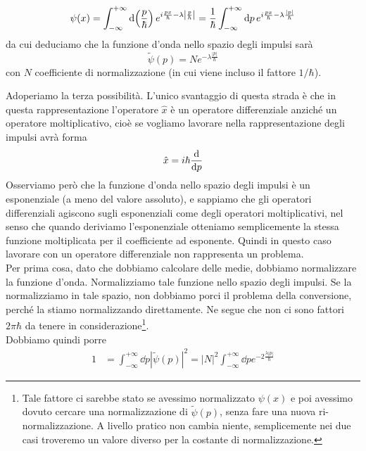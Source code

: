\begin{soluzione}
\begin{enumerate}
\begin{equation*}
         \psi(x)
         =\int_{-\infty}^{+\infty} \dd{\qty(\frac{p}{\hbar})} e^{ i\frac{px}{\hbar} - \lambda\qty|\frac{p}{\hbar}| }
         =\frac{1}{\hbar} \int_{-\infty}^{+\infty} \dd{p} e^{ i\frac{px}{\hbar} - \lambda\frac{|p|}{\hbar} }
      \end{equation*}
      da cui deduciamo che la funzione d'onda nello spazio degli impulsi sarà
      \begin{equation*}
         \tilde{\psi}(p)=Ne^{- \lambda\frac{|p|}{\hbar}}
      \end{equation*}
      con $N$ coefficiente di normalizzazione (in cui viene incluso il fattore $1/\hbar$).
   \end{enumerate}
   Adoperiamo la terza possibilità. L'unico svantaggio di questa strada è che in questa rappresentazione l'operatore $\hat{x}$ è un operatore differenziale anziché un operatore moltiplicativo, cioè se vogliamo lavorare nella rappresentazione degli impulsi avrà forma
   \begin{equation*}
      \hat{x}=i\hbar\dv{p}
   \end{equation*}
   Osserviamo però che la funzione d'onda nello spazio degli impulsi è un esponenziale (a meno del valore assoluto), e sappiamo che gli operatori differenziali agiscono sugli esponenziali come degli operatori moltiplicativi, nel senso che quando deriviamo l'esponenziale otteniamo semplicemente la stessa funzione moltiplicata per il coefficiente ad esponente. Quindi in questo caso lavorare con un operatore differenziale non rappresenta un problema.\\
   Per prima cosa, dato che dobbiamo calcolare delle medie, dobbiamo normalizzare la funzione d'onda. Normalizziamo tale funzione nello spazio degli impulsi. Se la normalizziamo in tale spazio, non dobbiamo porci il problema della conversione, perché la stiamo normalizzando direttamente. Ne segue che non ci sono fattori $2\pi\hbar$ da tenere in considerazione\footnote{Tale fattore ci sarebbe stato se avessimo normalizzato $\psi(x)$ e poi avessimo dovuto cercare una normalizzazione di $\tilde{\psi}(p)$, senza fare una nuova ri-normalizzazione. A livello pratico non cambia niente, semplicemente nei due casi troveremo un valore diverso per la costante di normalizzazione.}.\\
   Dobbiamo quindi porre
   \begin{equation*}
      \begin{split}
         1
         & =\int_{-\infty}^{+\infty} \dd{p} |\tilde{\psi}(p)|^2
         =|N|^2 \int_{-\infty}^{+\infty} \dd{p} e^{-2\frac{\lambda|p|}{\hbar}}

\end{split}
\end{equation*}
\end{soluzione}
